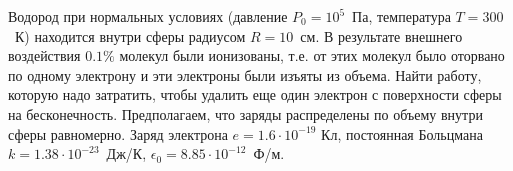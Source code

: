 
Водород при нормальных условиях (давление $P_0=10^5$~Па, температура \linebreak $T=300$~К) находится внутри сферы радиусом $R=10$~см. В результате внешнего воздействия $0.1\%$ молекул 
были ионизованы, т.е. от этих молекул было оторвано по одному электрону и эти электроны были изъяты из объема. Найти работу, которую надо затратить, чтобы удалить еще 
один электрон с поверхности сферы на бесконечность. Предполагаем, что заряды распределены по объему внутри сферы равномерно. Заряд электрона $e = 1.6 \cdot 10^{-19}$ Кл, постоянная 
Больцмана $k=1.38 \cdot 10^{-23}$~Дж/К, $\epsilon_0=8.85 \cdot 10^{-12}$~Ф/м.
